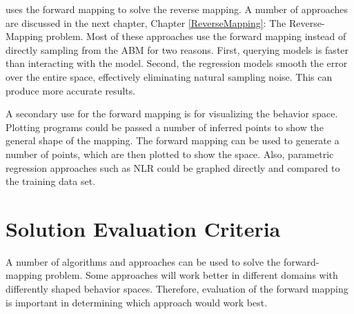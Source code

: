 \fw uses the forward mapping to solve the reverse mapping.
A number of approaches are discussed in the next chapter, Chapter \ref{ReverseMapping}: The Reverse-Mapping problem.
Most of these approaches use the forward mapping instead of directly sampling from the ABM for two reasons.
First, querying models is faster than interacting with the model.
Second, the regression models smooth the error over the entire space, effectively eliminating natural sampling noise.
This can produce more accurate results.

A secondary use for the forward mapping is for visualizing the behavior space.
Plotting programs could be passed a number of inferred points to show the general shape of the mapping.
The forward mapping can be used to generate a number of points, which are then plotted to show the space.
Also, parametric regression approaches such as NLR could be graphed directly and compared to the training data set.



\section{Solution Evaluation Criteria}
\label{sec:soln_eval}
A number of algorithms and approaches can be used to solve the forward-mapping problem.
Some approaches will work better in different domains with differently shaped behavior spaces.
Therefore, evaluation of the forward mapping is important in determining which approach would work best.

